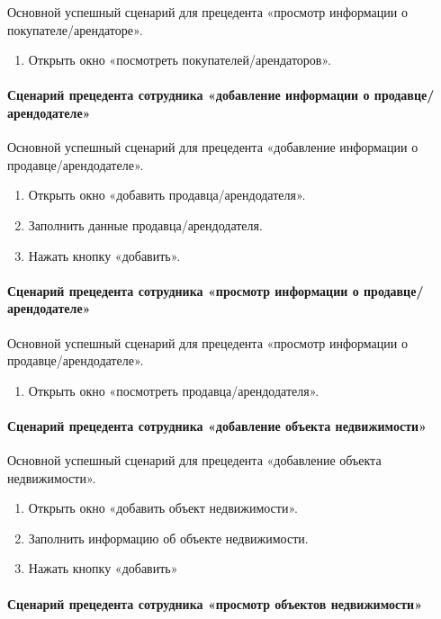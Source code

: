 Основной успешный сценарий для прецедента «просмотр информации о покупателе/арендаторе».
\begin{enumerate}
\item	Открыть окно «посмотреть покупателей/арендаторов».
\end{enumerate}
\paragraph{Сценарий прецедента сотрудника «добавление информации о продавце/арендодателе»}

Основной успешный сценарий для прецедента «добавление информации о продавце/арендодателе».
\begin{enumerate}
\item	Открыть окно «добавить продавца/арендодателя».

\item	Заполнить данные продавца/арендодателя.

\item	Нажать кнопку «добавить».
\end{enumerate}
\paragraph{Сценарий прецедента сотрудника «просмотр информации о продавце/арендодателе»}

Основной успешный сценарий для прецедента «просмотр информации о продавце/арендодателе».
\begin{enumerate}
\item Открыть окно «посмотреть продавца/арендодателя».
\end{enumerate}
\paragraph{Сценарий прецедента сотрудника «добавление объекта недвижимости»}

Основной успешный сценарий для прецедента «добавление объекта недвижимости».
\begin{enumerate}
\item	Открыть окно «добавить объект недвижимости».

\item	Заполнить информацию об объекте недвижимости.

\item	Нажать кнопку «добавить»
\end{enumerate}
\paragraph{Сценарий прецедента сотрудника «просмотр объектов недвижимости»}


